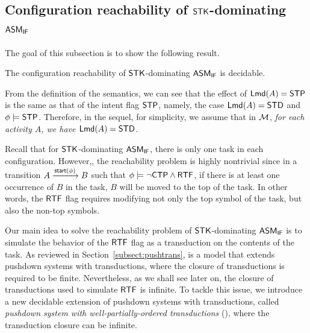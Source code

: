 



\subsection{Configuration reachability of $\mathsf{STK}$-dominating $\textsf{ASM}_\textsf{IF}$}

The goal of this subsection is to show the following result. 

\begin{theorem}\label{thm-reach-ifamass}
The configuration reachability of $\mathsf{STK}$-dominating $\textsf{ASM}_\textsf{IF}$ is decidable. 
\end{theorem}



From the definition of the semantics, we can see that the effect of ${\sf Lmd}(A) = {\sf STP}$ is the same as that of the intent flag $\mathsf{STP}$, namely, the case ${\sf Lmd}(A) = {\sf STD}$ and $\phi \models \mathsf{STP}$. Therefore, in the sequel, for simplicity, we assume that in ${\mathcal{M} }$, \emph{for each activity $A$, we have ${\sf Lmd}(A) = {\sf STD}$}. 


Recall that for  $\mathsf{STK}$-dominating $\textsf{ASM}_\textsf{IF}$, there is only one task in each configuration. %
However,, the reachability problem %
is highly nontrivial since in a transition $A \xrightarrow{{\mathsf{start} }(\phi)} B$ such that $\phi \models \neg {\sf CTP} \wedge {\sf RTF}$, if there is at least one occurrence of $B$ in the task, $B$ will be moved to the top of the task. In other words, the ${\sf RTF}$ flag requires modifying not only the top symbol of the task, but also the non-top symbols. 

Our main idea to solve the reachability problem of $\mathsf{STK}$-dominating $\textsf{ASM}_\textsf{IF}$ is to simulate the behavior of the ${\sf RTF}$ flag as a transduction on the contents of the task. As reviewed in Section~\ref{subsect:pushtrans}, {\TrPDS} is a model that extends pushdown systems with transductions, where the closure of transductions is required to be finite. Nevertheless, as we shall see later on, the closure of transductions used to simulate ${\sf RTF}$ is infinite. To tackle this issue, we introduce a new decidable extension of pushdown systems with transductions, called \emph{pushdown system with well-partially-ordered transductions} (\WOTrPDS), where the transduction closure can be infinite. 


